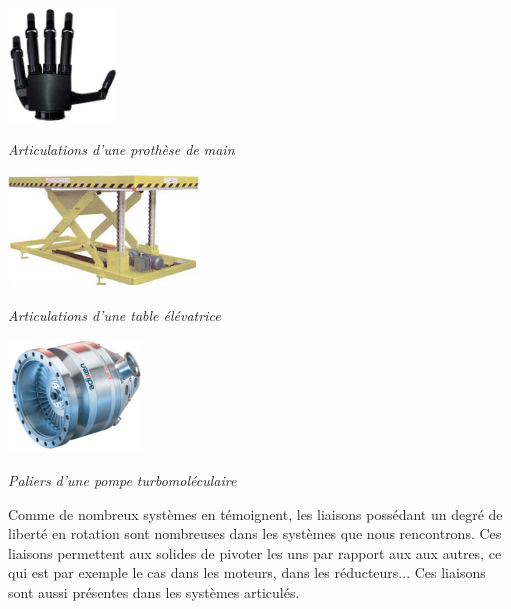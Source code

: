 \documentclass[11pt,oneside]{article}
\begin{document}
\noindent\begin{minipage}[c]{.3\linewidth}
\begin{center}
\includegraphics[height=3cm]{png/img1}

\textit{Articulations d'une prothèse de main \cite{im1}}
\end{center}
\end{minipage}\hfill
\begin{minipage}[c]{.3\linewidth}
\begin{center}
\includegraphics[height=3cm]{png/img2}

\textit{Articulations d'une table élévatrice} \cite{im2}
\end{center}
\end{minipage}\hfill
\begin{minipage}[c]{.3\linewidth}
\begin{center}
\includegraphics[height=3cm]{png/img3} 

\textit{Paliers d'une pompe turbomoléculaire} \cite{im3}\\
\end{center}
\end{minipage}

\vspace{.5cm}

Comme de nombreux systèmes en témoignent, les liaisons possédant un degré de liberté en rotation sont nombreuses dans les systèmes que nous rencontrons. Ces liaisons permettent aux solides de pivoter les uns par rapport aux aux autres, ce qui est par exemple le cas dans les moteurs, dans les réducteurs... Ces liaisons sont aussi présentes dans les systèmes articulés. 
\end{document}
